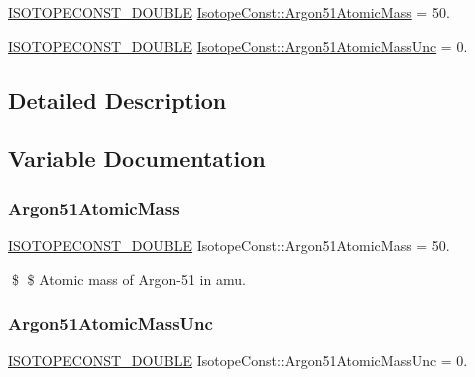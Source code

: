 \begin{DoxyCompactItemize}
\item 
\mbox{\hyperlink{group___isotope_const-_macros_ga8f45a7272ce02c0b4c65c44636ed719a}{I\+S\+O\+T\+O\+P\+E\+C\+O\+N\+S\+T\+\_\+\+D\+O\+U\+B\+LE}} \mbox{\hyperlink{group___isotope_const-_argon-_ar51_gadef4f3bb07394521aa7f3c3a90194c48}{Isotope\+Const\+::\+Argon51\+Atomic\+Mass}} = 50.
\item 
\mbox{\hyperlink{group___isotope_const-_macros_ga8f45a7272ce02c0b4c65c44636ed719a}{I\+S\+O\+T\+O\+P\+E\+C\+O\+N\+S\+T\+\_\+\+D\+O\+U\+B\+LE}} \mbox{\hyperlink{group___isotope_const-_argon-_ar51_ga1f2c429fba52b92ad636452ac67475b4}{Isotope\+Const\+::\+Argon51\+Atomic\+Mass\+Unc}} = 0.
\end{DoxyCompactItemize}


\subsection{Detailed Description}


\subsection{Variable Documentation}
\mbox{\label{group___isotope_const-_argon-_ar51_gadef4f3bb07394521aa7f3c3a90194c48}} 
\subsubsection{\texorpdfstring{Argon51\+Atomic\+Mass}{Argon51AtomicMass}}
{\footnotesize\ttfamily \mbox{\hyperlink{group___isotope_const-_macros_ga8f45a7272ce02c0b4c65c44636ed719a}{I\+S\+O\+T\+O\+P\+E\+C\+O\+N\+S\+T\+\_\+\+D\+O\+U\+B\+LE}} Isotope\+Const\+::\+Argon51\+Atomic\+Mass = 50.}

\$ \$ Atomic mass of Argon-\/51 in amu. \mbox{\label{group___isotope_const-_argon-_ar51_ga1f2c429fba52b92ad636452ac67475b4}} 
\subsubsection{\texorpdfstring{Argon51\+Atomic\+Mass\+Unc}{Argon51AtomicMassUnc}}
{\footnotesize\ttfamily \mbox{\hyperlink{group___isotope_const-_macros_ga8f45a7272ce02c0b4c65c44636ed719a}{I\+S\+O\+T\+O\+P\+E\+C\+O\+N\+S\+T\+\_\+\+D\+O\+U\+B\+LE}} Isotope\+Const\+::\+Argon51\+Atomic\+Mass\+Unc = 0.}

